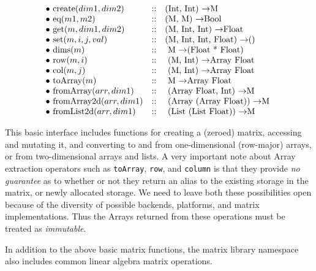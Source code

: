 \[
\begin{array}{lcl}
\bullet$ $ $create$(dim1,dim2)     & :: &  $(Int, Int)                \ra   M$   \\
\bullet$ $ $eq$(m1, m2)            & :: &  $(M, M)          \ra   Bool$   \\
\bullet$ $ $get$(m, dim1, dim2)    & :: &  $(M, Int, Int)        \ra   Float$   \\
\bullet$ $ $set$(m, i, j, val)     & :: &  $(M, Int, Int, Float) \ra   ()$ \\
\bullet$ $ $dims$(m)               & :: &  $ M                   \ra   (Float * Float)$ \\
\bullet$ $ $row$(m,i)              & :: &  $ (M, Int)            \ra   Array Float$ \\
\bullet$ $ $col$(m,j)              & :: &  $ (M, Int)            \ra   Array Float$ \\
\bullet$ $ $toArray$(m)            & :: &  $ M                   \ra   Array Float $ \\
\bullet$ $ $fromArray$(arr,dim1)   & :: &  $ (Array Float, Int)       \ra   M $ \\
\bullet$ $ $fromArray2d$(arr,dim1) & :: &  $ (Array (Array Float))    \ra   M $ \\
\bullet$ $ $fromList2d$(arr,dim1)  & :: &  $ (List (List Float))    \ra   M $ \\
\end{array}
\]

This basic interface includes functions for creating a (zeroed)
matrix, accessing and mutating it, and converting to and from
one-dimensional (row-major) arrays, or from two-dimensional arrays and
lists.  A very important note about Array extraction operators such as
{\tt toArray}, {\tt row}, and {\tt column} is that they provide {\em
no guarantee} as to whether or not they return an alias to the
existing storage in the matrix, or newly allocated storage.  We need
to leave both these possibilities open because of the diversity of
possible backends, platforms, and matrix implementations.  Thus the
Arrays returned from these operations must be treated as {\em
immutable}.

In addition to the above basic matrix functions, the matrix library
namespace also includes common linear algebra matrix operations.

